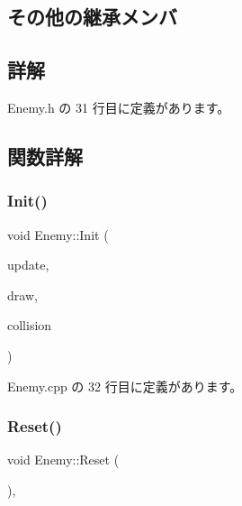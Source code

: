 \subsection*{その他の継承メンバ}


\subsection{詳解}


 Enemy.\+h の 31 行目に定義があります。



\subsection{関数詳解}
\mbox{\label{class_enemy_a678f73f8af13e1bc55be3fdad2608399}} 
\subsubsection{\texorpdfstring{Init()}{Init()}}
{\footnotesize\ttfamily void Enemy\+::\+Init (\begin{DoxyParamCaption}\item[{\mbox{\hyperlink{class_update_base}{Update\+Base}} $\ast$}]{update,  }\item[{\mbox{\hyperlink{class_draw_base}{Draw\+Base}} $\ast$}]{draw,  }\item[{\mbox{\hyperlink{class_collision_base}{Collision\+Base}} $\ast$}]{collision }\end{DoxyParamCaption})}



 Enemy.\+cpp の 32 行目に定義があります。

\mbox{\label{class_enemy_ab86571061e7fcabcf8c646b1abad5581}} 
\subsubsection{\texorpdfstring{Reset()}{Reset()}}
{\footnotesize\ttfamily void Enemy\+::\+Reset (\begin{DoxyParamCaption}{ }\end{DoxyParamCaption})\hspace{0.3cm}{\ttfamily [override]}, {\ttfamily [virtual]}}



